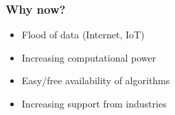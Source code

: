 

\begin{frame}[fragile]\frametitle{Why now?}
\begin{itemize}
\item Flood of data (Internet, IoT)
\item Increasing computational power
\item Easy/free availability of algorithms 
\item Increasing support from industries
\end{itemize}
\end{frame}




